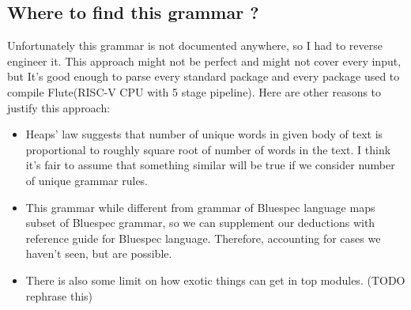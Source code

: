 \documentclass[14pt]{report}
\begin{document}
\subsection{Where to find this grammar ?}
Unfortunately this grammar is not documented anywhere, so I had to reverse engineer it. This approach might not be perfect and might not cover every input, but It's good enough to parse every standard package and every package used to compile Flute(RISC-V CPU with 5 stage pipeline).
Here are other reasons to justify this approach:
\begin{itemize}
    \item Heaps' law suggests that number of unique words in given body of text is proportional to roughly square root of number of words in the text. I think it's fair to assume that something similar will be true if we consider number of unique grammar rules.
    \item This grammar while different from grammar of Bluespec language maps subset of Bluespec grammar, so we can supplement our deductions with reference guide for Bluespec language. Therefore, accounting for cases we haven't seen, but are possible.
    \item There is also some limit on how exotic things can get in top modules. (TODO rephrase this)
\end{itemize}
\end{document}
